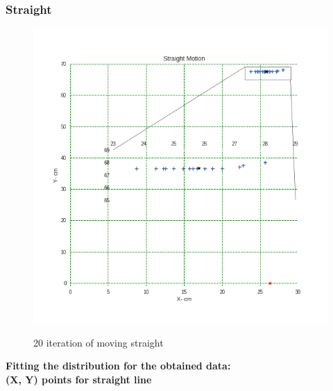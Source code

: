 \documentclass[11pt,a4paper,titlepage]{article}
\begin{document}
\begin{itemize}
\subsubsection{Straight}
\begin{figure}[H]
	\centering	
		\includegraphics[width=1.2\linewidth]{Straight}
		\label{fig:sub1}
	\caption{20 iteration of moving straight}
  \end{figure}
  \newpage
  \textbf{Fitting the distribution for the obtained data: \\ (X, Y) points for straight line}
  

\end{itemize}
\end{document}

